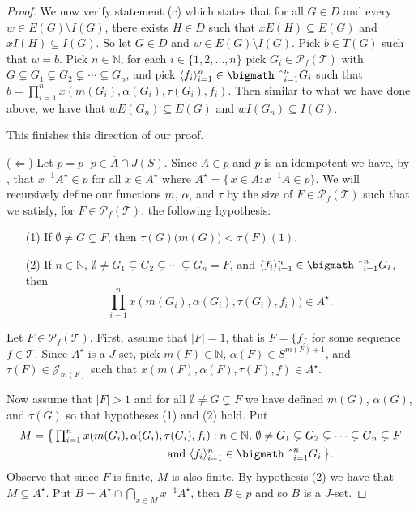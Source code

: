 \documentclass[12pt,showtrims]{memoir}
\theoremstyle{plain}
\theoremstyle{definition}
\newcommand{\la}{\langle}
\newcommand{\ra}{\rangle}
\newcommand{\bbN}{\mathbb{N}}
\newcommand{\calJ}{\mathcal{J}}
\newcommand{\calT}{\mathcal{T}}
\newcommand{\Pf}{\mathcal{P}_f}
\newcommand{\bigtimes}{\hbox{\bigmath \char'2}}
\begin{document}
\begin{proof}
  We now verify statement (c) which states that for all $G \in D$ and every $w \in E(G) \setminus I(G)$, there exists $H \in D$ such that $xE(H) \subseteq E(G)$ and $xI(H) \subseteq I(G)$.
  So let $G \in D$ and $w \in E(G) \setminus I(G)$. 
  Pick $b \in T(G)$ such that $w = \overline{b}$. 
  Pick $n \in \bbN$, for each $i \in \{1, 2, \ldots, n\}$ pick $G_i \in \Pf(\calT)$ with $G \subsetneq G_1 \subsetneq G_2 \subsetneq \cdots \subsetneq G_n$, and pick $\la f_i \ra_{i=1}^n \in \bigtimes_{i=1}^n G_i$ such that $b = \prod_{i=1}^n x(m(G_i), \alpha(G_i), \tau(G_i), f_i)$. 
  Then similar to what we have done above, we have that $wE(G_n) \subseteq E(G)$ and $wI(G_n) \subseteq I(G)$.

  This finishes this direction of our proof. 

  ($\Leftarrow$)
  Let $p = p \cdot p \in \overline{A} \cap J(S)$.
  Since $A \in p$ and $p$ is an idempotent we have, by \cite[Lemma 4.14]{Hindman:1998fk}, that $x^{-1}A^\star \in p$ for all $x \in A^\star$ where $A^\star = \{\, x \in A : x^{-1}A \in p\}$. 
  We will recursively define our functions $m$, $\alpha$, and $\tau$ by the size of $F \in \Pf(\calT)$ such that we satisfy, for $F \in \Pf(\calT)$, the following hypothesis:
  \begin{itemize}
    \item[(1)] If $\emptyset \ne G \subsetneq F$, then $\tau(G)\bigl( m(G) \bigr) < \tau(F)(1)$.
    
    \item[(2)] If $n \in \bbN$, $\emptyset \ne G_1 \subsetneq G_2 \subsetneq \cdots \subsetneq G_n = F$, and $\la f_i \ra_{i=1}^n \in \bigtimes_{i=1}^n G_i$, then \[\textstyle \prod_{i=1}^n x(m(G_i), \alpha(G_i), \tau(G_i), f_i)) \in A^\star.\]
  \end{itemize}

  Let $F \in \Pf(\calT)$.
  First, assume that $|F| = 1$, that is $F = \{f\}$ for some sequence $f \in \calT$.
  Since $A^\star$ is a $J$-set, pick $m(F) \in \bbN$, $\alpha(F) \in S^{m(F)+1}$, and $\tau(F) \in \calJ_{m(F)}$ such that $x(m(F), \alpha(F), \tau(F), f) \in A^\star$. 

  Now assume that $|F| > 1$ and for all $\emptyset \ne G \subsetneq F$ we have defined $m(G)$, $\alpha(G)$, and $\tau(G)$ so that hypotheses (1) and (2) hold.
  Put 
  \begin{align*}
    M &= \bigl\{\, \textstyle \prod_{i=1}^n x(m(G_i), \alpha(G_i), \tau(G_i), f_i) : \mbox{$n \in \bbN$, $\emptyset \ne G_1 \subsetneq G_2 \subsetneq \cdots \subsetneq G_n \subsetneq F$} \\
    &\hspace{12em} \mbox{and $\la f_i \ra_{i=1}^n \in \bigtimes_{i=1}^n G_i$} \,\bigr\}.
  \end{align*}
  Observe that since $F$ is finite, $M$ is also finite.
  By hypothesis (2) we have that $M \subseteq A^\star$.
  Put $B = A^\star \cap \bigcap_{x \in M} x^{-1}A^\star$, then $B \in p$ and so $B$ is a $J$-set. 


\end{proof}
\end{document}
